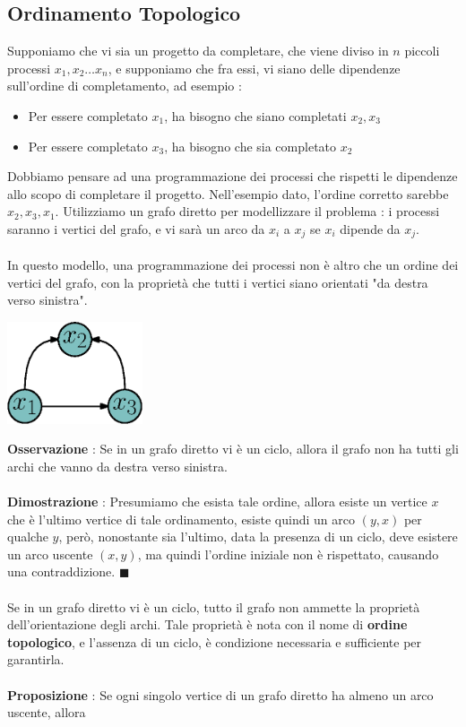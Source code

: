 \documentclass[12pt, letterpaper]{article}
\newcommand{\acc}{\\\hphantom{}\\}
\begin{document}
\subsection{Ordinamento Topologico}
Supponiamo che vi sia un progetto da completare, che viene diviso in \(n\) piccoli processi
\(x_1,x_2\dots x_n\), e supponiamo che fra essi, vi siano delle dipendenze sull'ordine di completamento, ad
esempio : \begin{itemize}
    \item Per essere completato \(x_1\), ha bisogno che siano completati \(x_2,x_3\)
    \item Per essere completato \(x_3\), ha bisogno che sia completato \(x_2\)
\end{itemize}
Dobbiamo pensare ad una programmazione dei processi che rispetti le dipendenze allo scopo di completare il progetto.
Nell'esempio dato, l'ordine corretto sarebbe \(x_2,x_3,x_1\). Utilizziamo un grafo diretto per modellizzare il
problema : i processi saranno i vertici del grafo, e vi sarà un arco da \(x_i\) a \(x_j\) se \(x_i\) dipende
da \(x_j\).\acc In questo modello, una programmazione dei processi non è altro che un ordine dei vertici
del grafo, con la proprietà che tutti i vertici siano orientati "da destra verso sinistra".\begin{center}
    \includegraphics[width=0.3\textwidth ]{images/processiGrafo.eps}
\end{center}
\textbf{Osservazione} : Se in un grafo diretto vi è un ciclo, allora il grafo non ha tutti gli archi che vanno
da destra verso sinistra. \acc
\textbf{Dimostrazione} : Presumiamo che esista tale ordine, allora esiste un vertice \(x\) che è l'ultimo vertice
di tale ordinamento, esiste quindi un arco \((y,x)\) per qualche \(y\), però, nonostante sia l'ultimo,
data la presenza di un ciclo, deve esistere un arco uscente \((x,y)\), ma quindi l'ordine iniziale non è rispettato,
causando una contraddizione. \(\blacksquare\)\acc
Se in un grafo diretto vi è un ciclo, tutto il grafo non ammette la proprietà dell'orientazione degli archi. Tale
proprietà è nota con il nome di \textbf{ordine topologico}, e l'assenza di un ciclo, è condizione necessaria
e sufficiente per garantirla.\acc
\textbf{Proposizione} : Se ogni singolo vertice di un grafo diretto ha almeno un arco uscente, allora
\end{document}
